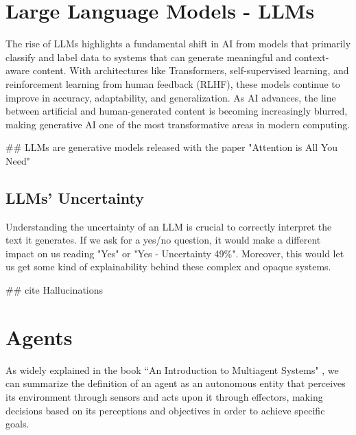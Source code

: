 \section{Large Language Models - LLMs}
\label{sec:large_language_models_llms} The rise of LLMs highlights a fundamental
shift in AI from models that primarily classify and label data to systems that can
generate meaningful and context-aware content. With architectures like
Transformers, self-supervised learning, and reinforcement learning from human
feedback (RLHF), these models continue to improve in accuracy, adaptability, and
generalization. As AI advances, the line between artificial and human-generated content
is becoming increasingly blurred, making generative AI one of the most
transformative areas in modern computing.

\#\# LLMs are generative models released with the paper "Attention is All You
Need"

\subsection{LLMs' Uncertainty}
\label{sub:llms_uncertainty}

Understanding the uncertainty of an LLM is crucial to correctly interpret the text
it generates. If we ask for a yes/no question, it would make a different impact on
us reading "Yes" or "Yes - Uncertainty 49\%". Moreover, this would let us get
some kind of explainability behind these complex and opaque systems.

\#\# cite Hallucinations

\section{Agents}
\label{sec:agents}


As widely explained in the book ``An Introduction to Multiagent Systems" \cite{wooldridge2002multiagent},
we can summarize the definition of an agent as an autonomous entity that
perceives its environment through sensors and acts upon it through effectors, making
decisions based on its perceptions and objectives in order to achieve specific goals.

